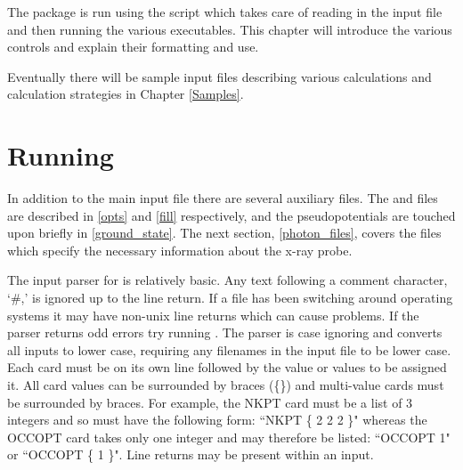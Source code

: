 \documentclass[11pt]{report}
\begin{document}
The \OCEAN{} package is run using the  script  which takes care of reading in the input file and then running the various executables. This chapter will introduce the various controls and explain their formatting and use.

Eventually there will be sample input files describing various calculations and calculation strategies in Chapter \ref{Samples}.

\section{Running \OCEAN}

In addition to the main input file there are several auxiliary files. The  and  files are described in  \ref{opts}  and \ref{fill} respectively, and the pseudopotentials are touched upon briefly in  \ref{ground_state}. The next section, \ref{photon_files}, covers the  files which specify the necessary information about the x-ray probe. 

The input parser for \OCEAN{} is relatively basic. Any text following a comment character, `\#,' is ignored up to the line return. If a file has been switching around operating systems it may have non-unix line returns which can cause problems. If the parser returns odd errors try running . The parser is case ignoring and converts all inputs to lower case, requiring any filenames in the input file to be lower case. Each card must be on its own line followed by the value or values to be assigned it. All card values can be surrounded by braces (\{\}) and multi-value cards must be surrounded by braces. For example, the NKPT card must be a list of 3 integers and so must have the following form: ``NKPT \{ 2 2 2 \}" whereas the OCCOPT card takes only one integer and may therefore be listed: ``OCCOPT 1" or ``OCCOPT \{ 1 \}". Line returns may be present within an input. 
\end{document}
